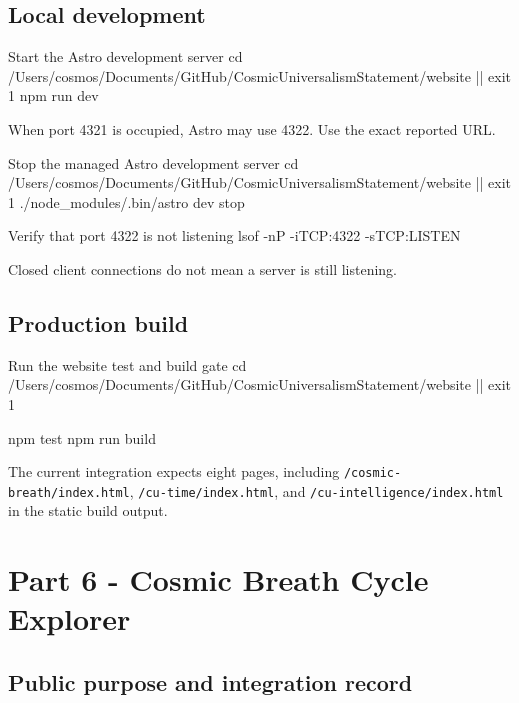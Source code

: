\documentclass[11pt,letterpaper]{article}
\newcommand{\filepath}[1]{\nolinkurl{#1}}
\begin{document}
\subsection{Local development}

\begin{commandbox}{Start the Astro development server}
cd /Users/cosmos/Documents/GitHub/CosmicUniversalismStatement/website || exit 1
npm run dev
\end{commandbox}

When port 4321 is occupied, Astro may use 4322. Use the exact reported URL.

\begin{commandbox}{Stop the managed Astro development server}
cd /Users/cosmos/Documents/GitHub/CosmicUniversalismStatement/website || exit 1
./node_modules/.bin/astro dev stop
\end{commandbox}

\begin{commandbox}{Verify that port 4322 is not listening}
lsof -nP -iTCP:4322 -sTCP:LISTEN
\end{commandbox}

Closed client connections do not mean a server is still listening.

\subsection{Production build}

\begin{commandbox}{Run the website test and build gate}
cd /Users/cosmos/Documents/GitHub/CosmicUniversalismStatement/website || exit 1

npm test
npm run build
\end{commandbox}

The current integration expects eight pages, including
\filepath{/cosmic-breath/index.html}, \filepath{/cu-time/index.html}, and
\filepath{/cu-intelligence/index.html} in the static build output.

\section{Part 6 - Cosmic Breath Cycle Explorer}

\subsection{Public purpose and integration record}
\end{document}
